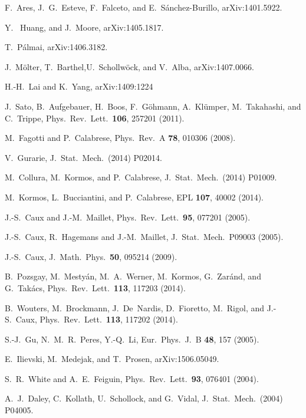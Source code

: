 \documentclass[twocolumn,superscriptaddress,prb,10pt]{revtex4-1}
\begin{document}
\begin{thebibliography}{99}
F.~Ares, J.~G.~Esteve, F.~Falceto, and E.~S\'anchez-Burillo, 
arXiv:1401.5922.

Y.~ Huang, and J.~Moore,  arXiv:1405.1817.

T.~P\'almai, arXiv:1406.3182.

J.~M\"olter, T.~Barthel,U.~Schollw\"ock, and V.~Alba, 
arXiv:1407.0066. 

H.-H.~Lai and K.~Yang, arXiv:1409:1224


J.~Sato, B.~Aufgebauer, H.~Boos, F.~G\"ohmann, A.~Kl\"umper, 
M.~Takahashi, and C.~Trippe, Phys.\ Rev.\ Lett.\ {\bf 106}, 257201 
(2011). 

M.~Fagotti and P.~Calabrese, Phys.\ Rev.\ A {\bf 78}, 010306 (2008).

V.~Gurarie, J.\ Stat.\ Mech.\ (2014) P02014. 

M.~Collura, M.~Kormos, and P.~Calabrese, J.\ Stat.\ Mech.\ (2014) P01009. 

M.~Kormos, L.~Bucciantini, and P.~Calabrese, EPL {\bf 107}, 40002 (2014). 

J.-S.~Caux and J.-M.~Maillet, Phys.\ Rev.\ Lett.\ {\bf 95}, 077201 (2005).

J.-S.~Caux, R.~Hagemans and J.-M.~Maillet, J.\ Stat.\ Mech.\ P09003 (2005). 

J.-S.~Caux, J.\ Math.\ Phys.\ {\bf 50}, 095214 (2009).


B.~Pozsgay, M.~Mesty\'an, M.~A.~Werner, M.~Kormos, G.~Zar\'and, and G.~Tak\'acs,
Phys.\ Rev.\ Lett.\ {\bf 113}, 117203 (2014). 

B.~Wouters, M.~Brockmann, J.~De~Nardis, D.~Fioretto, M.~Rigol, and J.-S.~Caux, 
Phys.\ Rev.\ Lett.\ {\bf 113}, 117202 (2014). 

S.-J.~Gu, N.~M.~R.~Peres, Y.-Q.~Li, Eur.\ Phys.\ J.\ B {\bf 48}, 157 (2005). 

E.~Ilievski, M.~Medejak, and T.~Prosen, arXiv:1506.05049.

S.~R.~White and A.~E.~Feiguin, Phys.\ Rev.\ Lett.\ {\bf 93}, 076401 (2004).

A.~J.~Daley, C.~Kollath, U.~Schollock, and G.~Vidal, J.\ Stat.\ Mech.\ (2004) P04005.


\end{thebibliography}
\end{document}
